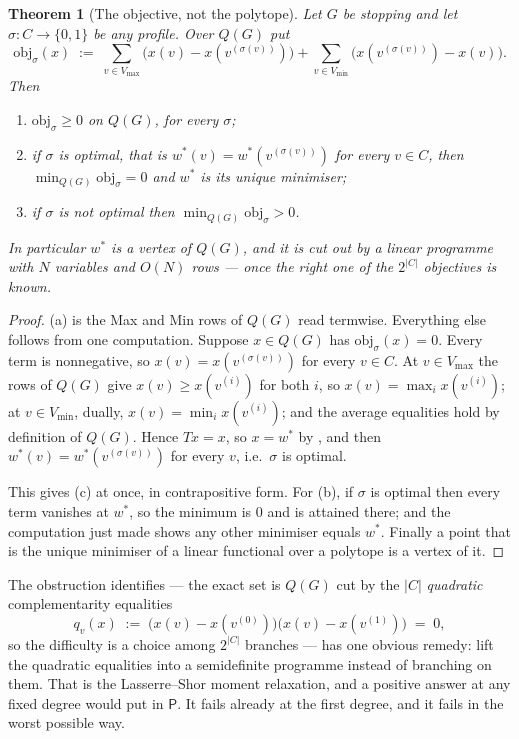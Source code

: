 \documentclass[11pt]{article}
\theoremstyle{plain}
\newtheorem{theorem}{Theorem}[section]
\theoremstyle{definition}
\newcommand{\Vmax}{V_{\max}}
\newcommand{\Vmin}{V_{\min}}
\begin{document}
\begin{theorem}[The objective, not the polytope]\label{thm:transport-objective}
Let $G$ be stopping and let $\sigma:C\to\{0,1\}$ be any profile. Over $Q(G)$
put
\[
  \mathrm{obj}_\sigma(x)\;:=\;
  \sum_{v\in\Vmax}\bigl(x(v)-x(v^{(\sigma(v))})\bigr)
  +\sum_{v\in\Vmin}\bigl(x(v^{(\sigma(v))})-x(v)\bigr).
\]
Then
\begin{enumerate}[label=(\alph*),leftmargin=2.2em]
\item $\mathrm{obj}_\sigma\ge0$ on $Q(G)$, for every $\sigma$;
\item if $\sigma$ is optimal, that is $w^\ast(v)=w^\ast(v^{(\sigma(v))})$ for
      every $v\in C$, then $\min_{Q(G)}\mathrm{obj}_\sigma=0$ and $w^\ast$ is
      its \emph{unique} minimiser;
\item if $\sigma$ is not optimal then $\min_{Q(G)}\mathrm{obj}_\sigma>0$.
\end{enumerate}
In particular $w^\ast$ is a \emph{vertex} of $Q(G)$, and it is cut out by a
linear programme with $N$ variables and $O(N)$ rows --- once the right one of
the $2^{|C|}$ objectives is known.
\end{theorem}

\begin{proof}
(a) is the Max and Min rows of $Q(G)$ read termwise. Everything else follows
from one computation. Suppose $x\in Q(G)$ has $\mathrm{obj}_\sigma(x)=0$. Every
term is nonnegative, so $x(v)=x(v^{(\sigma(v))})$ for every $v\in C$. At
$v\in\Vmax$ the rows of $Q(G)$ give $x(v)\ge x(v^{(i)})$ for both $i$, so
$x(v)=\max_ix(v^{(i)})$; at $v\in\Vmin$, dually, $x(v)=\min_ix(v^{(i)})$; and
the average equalities hold by definition of $Q(G)$. Hence $Tx=x$, so
$x=w^\ast$ by , and then
$w^\ast(v)=w^\ast(v^{(\sigma(v))})$ for every $v$, i.e.\ $\sigma$ is optimal.

This gives (c) at once, in contrapositive form. For (b), if $\sigma$ is optimal
then every term vanishes at $w^\ast$, so the minimum is $0$ and is attained
there; and the computation just made shows any other minimiser equals
$w^\ast$. Finally a point that is the unique minimiser of a linear functional
over a polytope is a vertex of it.
\end{proof}

\medskip
The obstruction  identifies --- the exact set
is $Q(G)$ cut by the $|C|$ \emph{quadratic} complementarity equalities
\[
  q_v(x)\;:=\;\bigl(x(v)-x(v^{(0)})\bigr)\bigl(x(v)-x(v^{(1)})\bigr)\;=\;0,
\]
so the difficulty is a choice among $2^{|C|}$ branches --- has one obvious
remedy: lift the quadratic equalities into a semidefinite programme instead
of branching on them. That is the Lasserre--Shor moment relaxation, and a
positive answer at any fixed degree would put  in
$\mathsf P$. It fails already at the first degree, and it fails in the worst
possible way.
\end{document}
